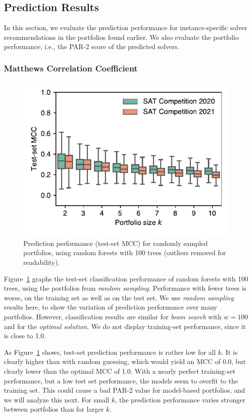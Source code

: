 \documentclass[runningheads]{llncs}
\begin{document}
\subsection{Prediction Results}

In this section, we evaluate the prediction performance for instance-specific solver recommendations in the portfolios found earlier. 
We also evaluate the portfolio performance, i.e., the PAR-2 score of the predicted solvers.

\subsubsection{Matthews Correlation Coefficient}

\begin{figure}[htb]
	\centering
	\includegraphics[width=0.5\columnwidth, trim=0 15 0 10, clip]{plots/prediction-test-mcc.pdf}
	\caption{
		Prediction performance (test-set MCC) for randomly sampled portfolios, using random forests with 100 trees (outliers removed for readability).
	}
	\label{fig:prediction-test-mcc}
\end{figure}

Figure~\ref{fig:prediction-test-mcc} graphs the test-set classification performance of random forests with 100 trees, using the portfolios from \emph{random sampling}.
Performance with fewer trees is worse, on the training set as well as on the test set.
We use \emph{random sampling} results here, to show the variation of prediction performance over many portfolios.
However, classification results are similar for \emph{beam search} with $w=100$ and for the \emph{optimal solution}.
We do not display training-set performance, since it is close to 1.0.

As Figure~\ref{fig:prediction-test-mcc} shows, test-set prediction performance is rather low for all $k$.
It is clearly higher than with random guessing, which would yield an MCC of 0.0, but clearly lower than the optimal MCC of 1.0.
With a nearly perfect training-set performance, but a low test set performance, the models seem to overfit to the training set.
This could cause a bad \mbox{PAR-2} value for model-based portfolios, and we will analyze this next.
For small $k$, the prediction performance varies stronger between portfolios than for larger $k$.
\end{document}
